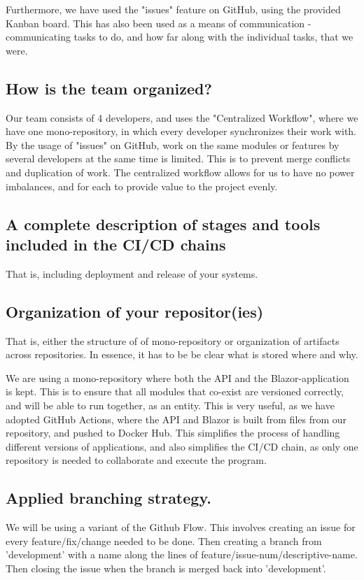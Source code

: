 \documentclass{article}
\begin{document}
Furthermore, we have used the "issues" feature on GitHub, using the provided Kanban board. This has also been used as a means of communication - communicating tasks to do, and how far along with the individual tasks, that we were.

\subsection{How is the team organized?}
Our team consists of 4 developers, and uses the "Centralized Workflow", where we have one mono-repository, in which every developer synchronizes their work with. By the usage of "issues" on GitHub, work on the same modules or features by several developers at the same time is limited. This is to prevent merge conflicts and duplication of work. The centralized workflow allows for us to have no power imbalances, and for each to provide value to the project evenly.

\subsection{A complete description of stages and tools included in the CI/CD chains}
That is, including deployment and release of your systems.

\subsection{Organization of your repositor(ies)}
That is, either the structure of of mono-repository or organization of artifacts across repositories.
In essence, it has to be be clear what is stored where and why.

We are using a mono-repository where both the API and the Blazor-application is kept. This is to ensure that all modules that co-exist are versioned correctly, and will be able to run together, as an entity. This is very useful, as we have adopted GitHub Actions, where the API and Blazor is built from files from our repository, and pushed to Docker Hub. This simplifies the process of handling different versions of applications, and also simplifies the CI/CD chain, as only one repository is needed to collaborate and execute the program.

\subsection{Applied branching strategy.}
We will be using a variant of the Github Flow. This involves creating an issue for every feature/fix/change needed to be done. Then creating a branch from 'development' with a name along the lines of feature/issue-num/descriptive-name. Then closing the issue when the branch is merged back into 'development'.
\end{document}

